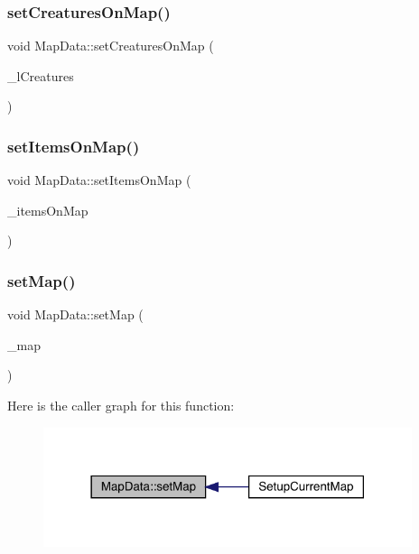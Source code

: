 \subsubsection{\texorpdfstring{set\+Creatures\+On\+Map()}{setCreaturesOnMap()}}
{\footnotesize\ttfamily void Map\+Data\+::set\+Creatures\+On\+Map (\begin{DoxyParamCaption}\item[{std\+::list$<$ \mbox{\hyperlink{class_base_creature}{Base\+Creature}} $>$}]{\+\_\+l\+Creatures }\end{DoxyParamCaption})}

\mbox{\label{class_map_data_a44e4f889a01270765db90de0ebb62aa5}} 
\subsubsection{\texorpdfstring{set\+Items\+On\+Map()}{setItemsOnMap()}}
{\footnotesize\ttfamily void Map\+Data\+::set\+Items\+On\+Map (\begin{DoxyParamCaption}\item[{std\+::list$<$ \mbox{\hyperlink{class_item}{Item}} $\ast$$>$}]{\+\_\+items\+On\+Map }\end{DoxyParamCaption})}

\mbox{\label{class_map_data_a8adfe57c9e74b6e306540dcb003feb95}} 
\subsubsection{\texorpdfstring{set\+Map()}{setMap()}}
{\footnotesize\ttfamily void Map\+Data\+::set\+Map (\begin{DoxyParamCaption}\item[{\mbox{\hyperlink{class_map}{Map}} $\ast$}]{\+\_\+map }\end{DoxyParamCaption})}

Here is the caller graph for this function\+:
\nopagebreak
\begin{figure}[H]
\begin{center}
\leavevmode
\includegraphics[width=306pt]{class_map_data_a8adfe57c9e74b6e306540dcb003feb95_icgraph}
\end{center}
\end{figure}
\mbox{\label{class_map_data_a2c65f950748fe264276e292f8a5b92f5}} 
